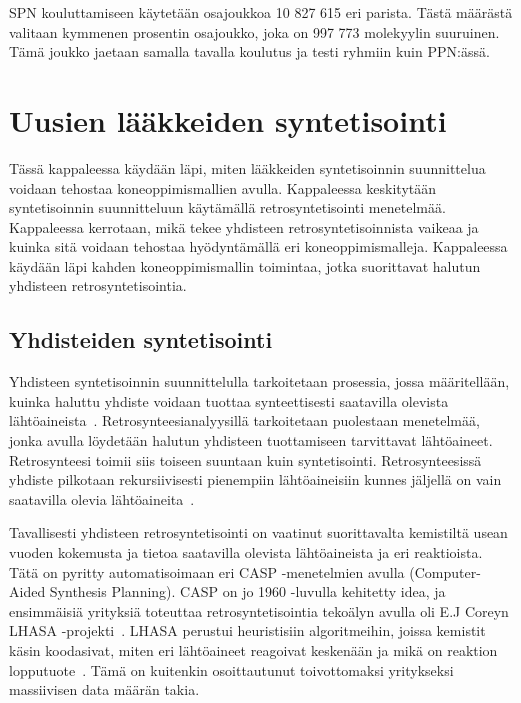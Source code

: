 \documentclass[finnish,twoside,censored,tkt,sw-line]{HYthesisML}
\begin{document}
SPN kouluttamiseen käytetään osajoukkoa 10 827 615 eri parista.
Tästä määrästä valitaan kymmenen prosentin osajoukko, joka on 997 773 molekyylin suuruinen.
Tämä joukko jaetaan samalla tavalla koulutus ja testi ryhmiin kuin PPN:ässä.

\chapter{Uusien lääkkeiden syntetisointi}

Tässä kappaleessa käydään läpi, miten lääkkeiden syntetisoinnin suunnittelua voidaan tehostaa koneoppimismallien avulla.
Kappaleessa keskitytään syntetisoinnin suunnitteluun käytämällä retrosyntetisointi menetelmää.
Kappaleessa kerrotaan, mikä tekee yhdisteen retrosyntetisoinnista vaikeaa ja kuinka sitä voidaan tehostaa hyödyntämällä eri koneoppimismalleja.
Kappaleessa käydään läpi kahden koneoppimismallin toimintaa, jotka suorittavat halutun yhdisteen retrosyntetisointia.

\section{Yhdisteiden syntetisointi}

Yhdisteen syntetisoinnin suunnittelulla tarkoitetaan prosessia, jossa määritellään, kuinka haluttu yhdiste voidaan tuottaa synteettisesti saatavilla olevista lähtöaineista~\cite{ColeyConnorW2018MLiC}.
Retrosynteesianalyysillä tarkoitetaan puolestaan menetelmää, jonka avulla löydetään halutun yhdisteen tuottamiseen tarvittavat lähtöaineet.
Retrosynteesi toimii siis toiseen suuntaan kuin syntetisointi.
Retrosynteesissä yhdiste pilkotaan rekursiivisesti pienempiin lähtöaineisiin kunnes jäljellä on vain saatavilla olevia lähtöaineita~\cite{ECoreyRetrosynthesis}.

Tavallisesti yhdisteen retrosyntetisointi on vaatinut suorittavalta kemistiltä usean vuoden kokemusta ja tietoa saatavilla olevista lähtöaineista ja eri reaktioista.
Tätä on pyritty automatisoimaan eri CASP -menetelmien avulla (Computer-Aided Synthesis Planning).
CASP on jo 1960 -luvulla kehitetty idea, ja ensimmäisiä yrityksiä toteuttaa retrosyntetisointia tekoälyn avulla oli E.J Coreyn LHASA -projekti~\cite{ColeyConnorW2018MLiC}.
LHASA perustui heuristisiin algoritmeihin, joissa kemistit käsin koodasivat, miten eri lähtöaineet reagoivat keskenään ja mikä on reaktion lopputuote~\cite{LHASA}.
Tämä on kuitenkin osoittautunut toivottomaksi yritykseksi massiivisen data määrän takia.
\end{document}
